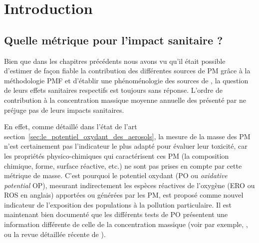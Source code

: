 \section{Introduction}%
\label{sec:intro_PO}

\subsection{Quelle métrique pour l'impact sanitaire ?}%
\label{sub:quelle_métrique_pour_l_impact_sanitaire_}


Bien que dans les chapitres précédents nous avons vu qu'il était possible d'estimer de
façon fiable la contribution des différentes sources de PM grâce à la méthodologie PMF et
d'établir une phénoménologie des sources de \PMdix, la question de leurs effets sanitaires
respectifs est toujours sans réponse. L'ordre de contribution à la concentration massique
moyenne annuelle des \PMdix{} présenté par \cite[(figure 3)]{weberComparison2019} ne
préjuge pas de leurs impacts sanitaires.

En effet, comme détaillé dans l'état de l'art
section~\ref{sec:le_potentiel_oxydant_des_aerosols}, la mesure de la masse des PM n'est
certainement pas l'indicateur le plus adapté pour évaluer leur toxicité, car les
propriétés physico-chimiques qui caractérisent ces PM (la composition chimique, forme, surface
réactive, etc.) ne sont pas prises en compte par cette métrique de masse.  C'est pourquoi le
potentiel oxydant (PO ou \textit{oxidative potential} OP), mesurant indirectement les espèces réactives de
l'oxygène (ERO ou ROS en anglais) apportées ou générées par les PM, est proposé comme
nouvel indicateur de l'exposition des populations à la pollution particulaire.  Il est
maintenant bien documenté que les différents tests de PO présentent une information
différente de celle de la concentration massique (voir par exemple,
\cite{choRedox2005,vermaReactive2014,batesReactive2015,fangOxidative2016,fangAmbient2017,calasSeasonal2019},
ou la revue détaillée récente de \cite{batesReview2019}).



